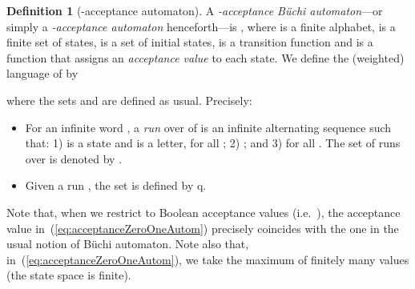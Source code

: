 \documentclass[a4paper,USenglish,numberwithinsect]{lipics}
\newif\ifignore \ignorefalse
\newcommand{\auxproof}[1]{
\ifignore\mbox{}\newline
\textbf{BEGIN: AUX-PROOF} \dotfill\newline
{#1}\mbox{}\newline
\textbf{END: AUX-PROOF}\dotfill\newline
\fi}
\theoremstyle{definition}
\newtheorem{defi}{Definition}[section]
\theoremstyle{remark}
\theoremstyle{plain}
\newtheorem{lem}[defi]{Lemma}
\begin{document}
 \begin{defi}[{}-acceptance automaton]
  \label{def:zeroOneAcceptanceBuchi}
  A \emph{-acceptance B\"uchi automaton}---or simply a
  \emph{-acceptance automaton} henceforth---is , where  is a finite  alphabet,
  is a finite set of states,  is a set of initial
 states,  is a
 transition function and  is 
 a function that assigns an \emph{acceptance value} to each state.
  We define the (weighted) language  of  by
  
 where the sets  and  are defined as
  usual. Precisely:
\begin{itemize}
 \item For an infinite word , a \emph{run} over 
       of  is an infinite alternating sequence
        such that: 1)  is a
       state and  is a letter, for all ; 2)
       ; and 3)
        for all . The set of
       runs over  is denoted by  .
 \item Given a run , the set
        is defined by
       q\rho.
\end{itemize}
\end{defi}
 Note that, when we restrict to Boolean acceptance values (i.e.\
), 
the acceptance value in~(\ref{eq:acceptanceZeroOneAutom})
precisely coincides with the one in the usual notion of B\"{u}chi
automaton.
Note also that, in~(\ref{eq:acceptanceZeroOneAutom}), we take the
maximum of finitely many values (the state space  is finite).

\auxproof{
{}-acceptance B\"uchi automata are quantitative extension of B\"uchi
automata. The extension, however, does not incur too much additional 
complexity. For example its threshold acceptance problem can be solved
by a B\"uchi automaton.

\begin{lem}
  Let  be a {}-acceptance B\"uchi automaton,
 , and .
 \begin{enumerate}
  \item There exists an (ordinary) B\"uchi automaton  such that 
  .
  \item Let  , and
   be an (ordinary) B\"uchi
	automaton. We have
  .
 \end{enumerate}
\end{lem}
\begin{proof}
 For 1., let  and let
 . \qed
\end{proof}
}
\end{document}
